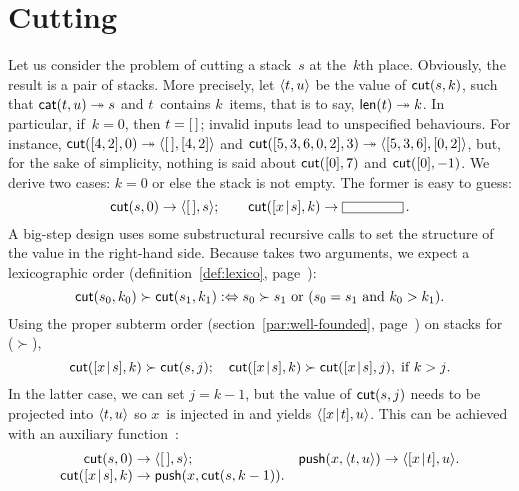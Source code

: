 \section{Cutting}
\label{sec:cutting}

 Let us consider the problem of cutting a
stack~\(s\) at the~\(k\)th place. Obviously, the result is a pair of
stacks. More precisely, let \(\langle{t},{u}\rangle\) be the value of
\(\textsf{cut}(s,k)\), such that \(\textsf{cat}(t,u) \twoheadrightarrow
s\) and \(t\)~contains \(k\)~items, that is to
say, \(\textsf{len}(t) \twoheadrightarrow k\). In particular, if~\(k =
0\), then \(t = [\,]\); invalid inputs lead to unspecified
behaviours. For instance, \(\textsf{cut}([4,2],0) \twoheadrightarrow
\langle{[\,]},{[4,2]}\rangle\) and \(\textsf{cut}([5,3,6,0,2],3) \twoheadrightarrow
\langle{[5,3,6]},{[0,2]}\rangle\), but, for the sake of simplicity, nothing is
said about \(\textsf{cut}([0],7)\) and \(\textsf{cut}([0],-1)\). We derive
two cases: \(k = 0\) or else the stack is not empty. The former is
easy to guess:
\begin{equation*}
\fun{cut}(s,0)           \rightarrow \pair{\el}{s};\qquad
\fun{cut}(\cons{x}{s},k) \rightarrow \fbcode{CCCCCC}\,.
\end{equation*}
A big\hyp{}step design uses some
sub\-structural recursive calls to set the structure of the value in
the right\hyp{}hand side. Because  takes two arguments, we
expect a lexicographic order
(definition~\eqref{def:lexico}, page~\pageref{def:lexico}):
\begin{equation*}
\textsf{cut}(s_0,k_0) \succ \textsf{cut}(s_1,k_1)
:\Leftrightarrow 
\text{\(s_0 \succ s_1\) or (\(s_0 = s_1\) and \(k_0 > k_1\))}.
\end{equation*}
Using the proper subterm order
(section~\ref{par:well-founded}, page~\pageref{par:well-founded}) on
stacks for (\(\succ\)),
\begin{equation*}
\textsf{cut}([{x}\!\mid\!{s}],k) \succ \textsf{cut}(s,j);\quad
\textsf{cut}([{x}\!\mid\!{s}],k) \succ \textsf{cut}([{x}\!\mid\!{s}],j),\;
\text{if \(k > j\)}.
\end{equation*}
In the latter case, we can set \(j=k-1\), but the value of
\(\textsf{cut}(s,j)\) needs to be projected into \(\langle{t},{u}\rangle\) so
\(x\)~is injected in and yields \(\langle{[{x}\!\mid\!{t}]},{u}\rangle\). This can be
achieved with an auxiliary
function~:
\begin{equation*}
\begin{array}{@{}r@{\;}l@{\;}lr@{\;}l@{\;}l@{}}
\fun{cut}(s,0) & \rightarrow & \pair{\el}{s};
& \fun{push}(x,\pair{t}{u}) & \rightarrow & \pair{\cons{x}{t}}{u}.\\
\fun{cut}(\cons{x}{s},k) & \rightarrow 
& \fun{push}(x,\fun{cut}(s,k-1)).
\end{array}
\end{equation*}


